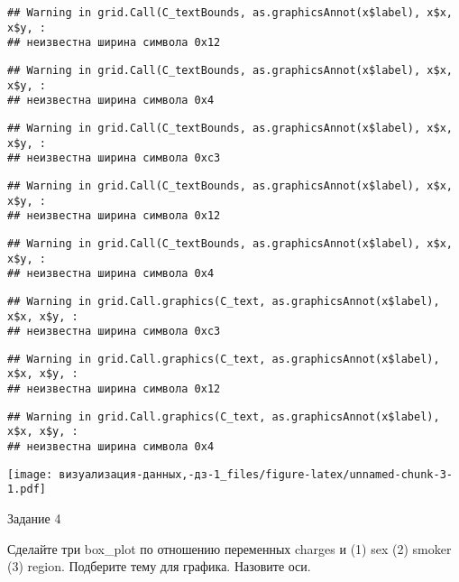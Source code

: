\documentclass[
]{article}
\begin{document}
\begin{verbatim}
## Warning in grid.Call(C_textBounds, as.graphicsAnnot(x$label), x$x, x$y, :
## неизвестна ширина символа 0x12
\end{verbatim}

\begin{verbatim}
## Warning in grid.Call(C_textBounds, as.graphicsAnnot(x$label), x$x, x$y, :
## неизвестна ширина символа 0x4
\end{verbatim}

\begin{verbatim}
## Warning in grid.Call(C_textBounds, as.graphicsAnnot(x$label), x$x, x$y, :
## неизвестна ширина символа 0xc3
\end{verbatim}

\begin{verbatim}
## Warning in grid.Call(C_textBounds, as.graphicsAnnot(x$label), x$x, x$y, :
## неизвестна ширина символа 0x12
\end{verbatim}

\begin{verbatim}
## Warning in grid.Call(C_textBounds, as.graphicsAnnot(x$label), x$x, x$y, :
## неизвестна ширина символа 0x4
\end{verbatim}

\begin{verbatim}
## Warning in grid.Call.graphics(C_text, as.graphicsAnnot(x$label), x$x, x$y, :
## неизвестна ширина символа 0xc3
\end{verbatim}

\begin{verbatim}
## Warning in grid.Call.graphics(C_text, as.graphicsAnnot(x$label), x$x, x$y, :
## неизвестна ширина символа 0x12
\end{verbatim}

\begin{verbatim}
## Warning in grid.Call.graphics(C_text, as.graphicsAnnot(x$label), x$x, x$y, :
## неизвестна ширина символа 0x4
\end{verbatim}

\texttt{[image: визуализация-данных,-дз-1\_files/figure-latex/unnamed-chunk-3-1.pdf]}

Задание 4

Сделайте три box\_plot по отношению переменных charges и (1) sex (2)
smoker (3) region. Подберите тему для графика. Назовите оси.
\end{document}
